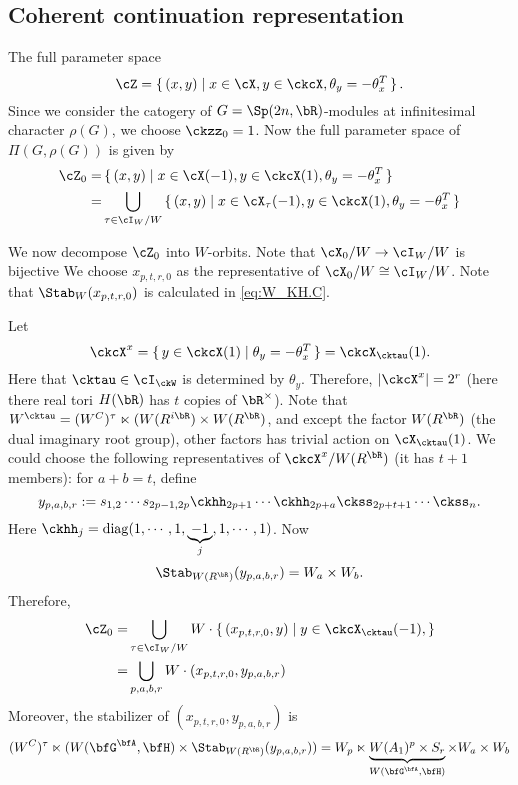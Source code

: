 \documentclass[12pt,a4paper]{amsart}
\newcommand{\diag}{\operatorname{diag}}
\numberwithin{equation}{section}
\theoremstyle{remark}
\begin{document}
\subsection{Coherent continuation representation}
The full parameter space
\[
  \cZ= \set{(x,y)|x\in \cX, y\in \ckcX, \theta_y=-\theta_x^T}.
\]
Since we consider the catogery of $G=\Sp(2n,\bR)$-modules at infinitesimal character
$\rho(G)$, we choose $\ckzz_0 = 1$.  
Now the full parameter space of $\Pi(G,\rho(G))$ is given by
\[
  \begin{split}
    \cZ_0 = & \set{(x,y)| x\in \cX(-1), y\in \ckcX(1), \theta_y = -\theta_x^T }\\
    = & \bigcup_{\tau\in \cI_W/W} \set{(x,y)| x \in \cX_\tau(-1), y\in \ckcX(1),
      \theta_y=-\theta_x^T}\\
  \end{split}
\]

We now decompose $\cZ_0$ into $W$-orbits. 
Note that $\cX_0/W\rightarrow \cI_W/W$ is bijective
We choose $x_{p,t,r,0}$ as the representative of $\cX_0/W\cong \cI_W/W$. 
Note that $\Stab_W(x_{p,t,r,0})$ is calculated in \eqref{eq:W_KH.C}.

Let
\[
  \ckcX^{x} = \set{y\in \ckcX(1)| \theta_y = -\theta_x^T}= \ckcX_{\cktau}(1).
\]
Here that $\cktau\in \cI_\ckW$ is determined by $\theta_y$.
Therefore, $|\ckcX^{x}| = 2^r$ (here there real
tori $H(\bR)$ has $t$ copies of $\bR^\times$).  Note that
$W^{\cktau} = (W^C)^\tau\ltimes(W(R^{i\bR})\times W(R^{\bR})$, and except the
factor  
$W(R^{\bR})$ (the dual imaginary root group), other factors has trivial action
on $\cX_\cktau(1)$. 
We could choose the following representatives of $\ckcX^x/W(R^{\bR})$ (it has
$t+1$ members): for $a+b=t$, define 
\[
  y_{p,a,b,r} := s_{1,2}\cdots s_{2p-1,2p} \ckhh_{2p+1}\cdots
  \ckhh_{2p+a}\ckss_{2p+t+1}\cdots \ckss_{n}.    
\]
Here $\ckhh_{j} = \diag(1, \cdots,1, \underbrace{-1}_{j},1, \cdots, 1) $.
Now
\[
  \Stab_{W(R^{\bR})}(y_{p,a,b,r}) = W_a\times W_b.
\]
Therefore, 
\[
  \begin{split}
  \cZ_0 = & \bigcup_{\tau\in \cI_W/W} W \cdot \set{(x_{p,t,r,0},y)| y \in \ckcX_\cktau(-1), }  \\
  = & \bigcup_{p,a,b,r} W\cdot (x_{p,t,r,0},y_{p,a,b,r})
  \end{split}
\]
Moreover, the stabilizer of $(x_{p,t,r,0},y_{p,a,b,r})$ is
\[
  (W^C)^\tau \ltimes (W(\bfG^\bfA,\bfH)\times \Stab_{W(R^{\bR})}(y_{p,a,b,r}))
   = W_p\ltimes \underbrace{W(A_1)^p\times S_r}_{W(\bfG^\bfA,\bfH)}\times   W_a\times W_b
\]
\end{document}
